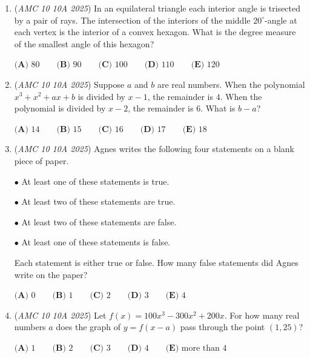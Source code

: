 \begin{enumerate}
 
 \[1,2,1,2,3,2,1,2,3,4,3,2,1,2,3,4,5,4,3,2,1,2,3,4,5,6,5,4,3,2,1,2,\dots\]


 What is the $2025$th term in this sequence?


 $\textbf{(A) } 5 \qquad\textbf{(B) } 15 \qquad\textbf{(C) } 16 \qquad\textbf{(D) } 44 \qquad\textbf{(E) } 45$


	\item (\textit{AMC 10 10A 2025}) In an equilateral triangle each interior angle is trisected by a pair of rays. The intersection of the interiors of the middle $20^{\circ}$-angle at each vertex is the interior of a convex hexagon. What is the degree measure of the smallest angle of this hexagon?


 $\textbf{(A) } 80 \qquad\textbf{(B) } 90 \qquad\textbf{(C) } 100 \qquad\textbf{(D) } 110 \qquad\textbf{(E) } 120$


	\item (\textit{AMC 10 10A 2025}) Suppose $a$ and $b$ are real numbers. When the polynomial $x^3+x^2+ax+b$ is divided by $x-1$, the remainder is $4$. When the polynomial is divided by $x-2$, the remainder is $6$. What is $b-a$?


 $\textbf{(A) } 14 \qquad\textbf{(B) } 15 \qquad\textbf{(C) } 16 \qquad\textbf{(D) } 17 \qquad\textbf{(E) } 18$


	\item (\textit{AMC 10 10A 2025}) Agnes writes the following four statements on a blank piece of paper.


 $\bullet$ At least one of these statements is true.


 $\bullet$ At least two of these statements are true.


 $\bullet$ At least two of these statements are false.


 $\bullet$ At least one of these statements is false.


 Each statement is either true or false. How many false statements did Agnes write on the paper?


 $\textbf{(A) } 0 \qquad\textbf{(B) } 1 \qquad\textbf{(C) } 2 \qquad\textbf{(D) } 3 \qquad\textbf{(E) } 4$


	\item (\textit{AMC 10 10A 2025}) Let $f(x) = 100x^3 - 300x^2 + 200x$. For how many real numbers $a$ does the graph of $y = f(x - a)$ pass through the point $(1, 25)$?


 $\textbf{(A) }1 \qquad\textbf{(B) }2 \qquad\textbf{(C) }3 \qquad\textbf{(D) }4 \qquad\textbf{(E) }\text{more than }4$



\end{enumerate}
